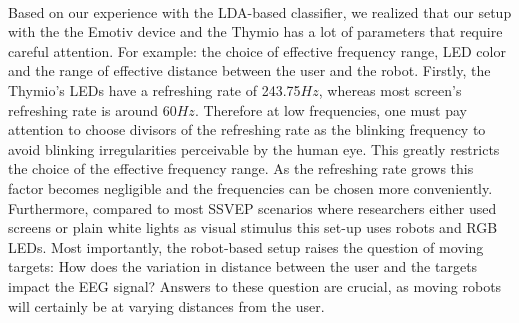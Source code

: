 \documentclass{svmult}
\begin{document}
\\
Based on our experience with the LDA-based classifier, we realized that our setup with the the Emotiv device and the Thymio has a lot of parameters that require careful attention. For example: the choice of effective frequency range, LED color and the range of effective distance between the user and the robot. Firstly, the Thymio's LEDs have a refreshing rate of 243.75$Hz$, whereas most screen's refreshing rate is around 60$Hz$. Therefore at low frequencies, one must pay attention to choose divisors of the refreshing rate as the blinking frequency to avoid blinking irregularities perceivable by the human eye. This greatly restricts the choice of the effective frequency range. As the refreshing rate grows this factor becomes negligible and the frequencies can be chosen more conveniently. Furthermore, compared to most SSVEP scenarios where researchers either used screens or plain white lights as visual stimulus this set-up uses robots and RGB LEDs. Most importantly, the robot-based setup raises the question of moving targets: How does the variation in distance between the user and the targets impact the EEG signal? Answers to these question are crucial, as moving robots will certainly be at varying distances from the user.\\
\end{document}
